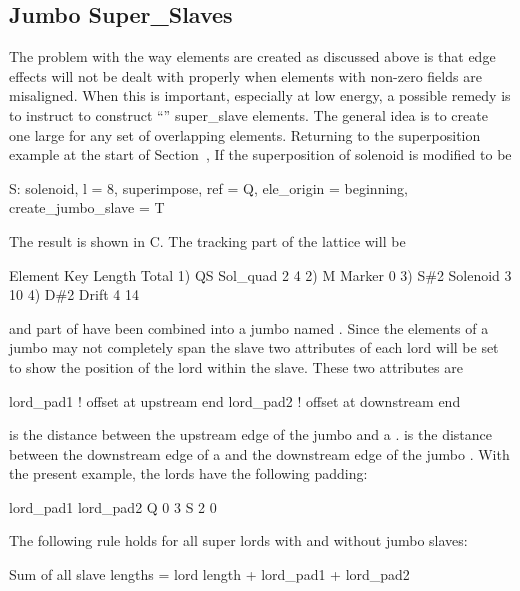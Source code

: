 \subsection{Jumbo Super_Slaves}
\label{s:jumbo.slave}

The problem with the way  elements are created as discussed above is that edge
effects will not be dealt with properly when elements with non-zero fields are misaligned. When this
is important, especially at low energy, a possible remedy is to instruct \bmad to construct
``'' super_slave elements. The general idea is to create one large  for
any set of overlapping elements. Returning to the superposition example at the start of
Section~, If the superposition of solenoid  is modified to be
\begin{example}
  S: solenoid, l = 8, superimpose, ref = Q, ele_origin = beginning, 
               create_jumbo_slave = T
\end{example}
The result is shown in C. The tracking part of the lattice will be
\begin{example}
        Element   Key         Length  Total     
  1)    Q{\B}S       Sol_quad     2        4
  2)    M         Marker       0      
  3)    S{\#}2       Solenoid     3       10
  4)    D{\#}2       Drift        4       14
\end{example}
 and part of  have been combined into a jumbo  named . Since
the  elements of a jumbo  may not completely span the slave two
attributes of each lord will be set to show the position of the lord within the slave. These two
attributes are
\begin{example}
  lord_pad1    ! offset at upstream end
  lord_pad2    ! offset at downstream end
\end{example}
 is the distance between the upstream edge of the jumbo  and a
.  is the distance between the downstream edge of a  and
the downstream edge of the jumbo . With the present example, the lords have the
following padding:
\begin{example}
          lord_pad1    lord_pad2
  Q            0            3
  S            2            0
\end{example}
The following rule holds for all super lords with and without jumbo slaves:
\begin{example}
  Sum of all slave lengths = lord length + lord_pad1 + lord_pad2
\end{example}

